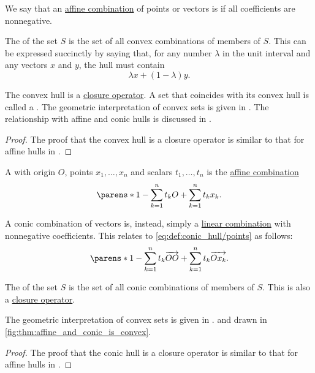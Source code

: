 \begin{definition}\label{def:convex_hull}\mimprovised
  We say that an \hyperref[rem:affine_combinations]{affine combination} of points or vectors is  if all coefficients are nonnegative.

  The  of the set \( S \) is the set of all convex combinations of members of \( S \). This can be expressed succinctly by saying that, for any number \( \lambda \) in the unit interval and any vectors \( x \) and \( y \), the hull must contain
  \begin{equation}\label{eq:def:convex_hull/combination}
    \lambda x + (1 - \lambda) y.
  \end{equation}

  The convex hull is a \hyperref[def:closure_operator]{closure operator}. A set that coincides with its convex hull is called a . The geometric interpretation of convex sets is given in . The relationship with affine and conic hulls is discussed in .
\end{definition}
\begin{proof}
  The proof that the convex hull is a closure operator is similar to that for affine hulls in .
\end{proof}

\begin{definition}\label{def:conic_hull}\mimprovised
  A  with origin \( O \), points \( x_1, \ldots, x_n \) and  scalars \( t_1, \ldots, t_n \) is the \hyperref[rem:affine_combinations]{affine combination}
  \begin{equation}\label{eq:def:conic_hull/points}
    \parens*{ 1 - \sum_{k=1}^n t_k } O + \sum_{k=1}^n t_k x_k.
  \end{equation}

  A conic combination of vectors is, instead, simply a \hyperref[rem:linear_combinations]{linear combination} with nonnegative coefficients. This relates to \eqref{eq:def:conic_hull/points} as follows:
  \begin{equation*}
    \parens*{ 1 - \sum_{k=1}^n t_k } \vect{OO} + \sum_{k=1}^n t_k \vect{O x_k}.
  \end{equation*}

  The  of the set \( S \) is the set of all conic combinations of members of \( S \). This is also a \hyperref[def:closure_operator]{closure operator}.

  The geometric interpretation of convex sets is given in . and drawn in \cref{fig:thm:affine_and_conic_is_convex}.
\end{definition}
\begin{proof}
  The proof that the conic hull is a closure operator is similar to that for affine hulls in .
\end{proof}

